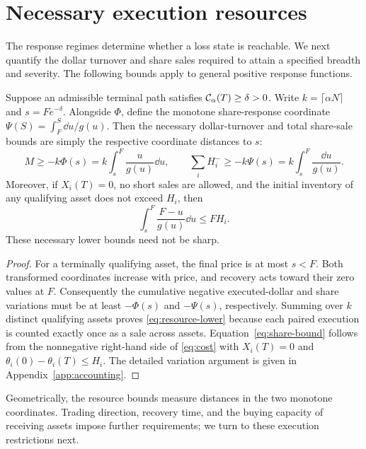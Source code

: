 \documentclass[review,hidelinks,onefignum,onetabnum]{siamonline250211}
\begin{document}
\section{Necessary execution resources}\label{sec:budget}
The response regimes determine whether a loss state is reachable. We next quantify the dollar turnover and share sales required to attain a specified breadth and severity. The following bounds apply to general positive response functions.

\begin{theorem}\label{thm:resource}
Suppose an admissible terminal path satisfies $\mathcal{C}_\alpha(T)\ge\delta>0$. Write $k=\lceil\alpha N\rceil$ and $s=Fe^{-\delta}$. Alongside $\Phi$, define the monotone share-response coordinate $\Psi(S)=\int_F^S\dd u/g(u)$. Then the necessary dollar-turnover and total share-sale bounds are simply the respective coordinate distances to $s$:
\begin{equation}\label{eq:resource-lower}
\boxed{M\ge -k\Phi(s)=k\int_s^F\frac{u}{g(u)}\dd u,\qquad
\sum_iH_i^-\ge -k\Psi(s)=k\int_s^F\frac{\dd u}{g(u)}.}
\end{equation}
Moreover, if $X_i(T)=0$, no short sales are allowed, and the initial inventory of any qualifying asset does not exceed $H_i$, then
\begin{equation}\label{eq:share-bound}
\boxed{\int_s^F\frac{F-u}{g(u)}\dd u\le FH_i.}
\end{equation}
These necessary lower bounds need not be sharp.
\end{theorem}
\begin{proof}
For a terminally qualifying asset, the final price is at most $s<F$. Both transformed coordinates increase with price, and recovery acts toward their zero values at $F$. Consequently the cumulative negative executed-dollar and share variations must be at least $-\Phi(s)$ and $-\Psi(s)$, respectively. Summing over $k$ distinct qualifying assets proves \eqref{eq:resource-lower} because each paired execution is counted exactly once as a sale across assets. Equation~\eqref{eq:share-bound} follows from the nonnegative right-hand side of \eqref{eq:cost} with $X_i(T)=0$ and $\theta_i(0)-\theta_i(T)\le H_i$. The detailed variation argument is given in Appendix~\ref{app:accounting}.
\end{proof}

Geometrically, the resource bounds measure distances in the two monotone coordinates. Trading direction, recovery time, and the buying capacity of receiving assets impose further requirements; we turn to these execution restrictions next.
\end{document}
